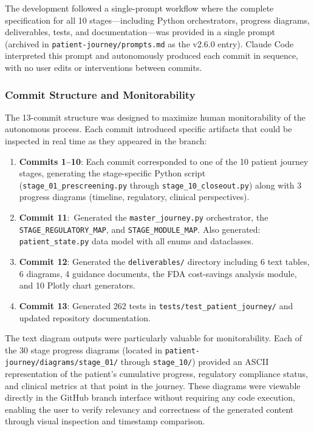 \documentclass{article}
\begin{document}
The development followed a single-prompt workflow where the complete specification for all 10 stages---including Python orchestrators, progress diagrams, deliverables, tests, and documentation---was provided in a single prompt (archived in \texttt{patient-journey/prompts.md} as the v2.6.0 entry). Claude Code interpreted this prompt and autonomously produced each commit in sequence, with no user edits or interventions between commits.

\subsubsection{Commit Structure and Monitorability}

The 13-commit structure was designed to maximize human monitorability of the autonomous process. Each commit introduced specific artifacts that could be inspected in real time as they appeared in the branch:

\begin{enumerate}[leftmargin=*]
\item \textbf{Commits 1--10}: Each commit corresponded to one of the 10 patient journey stages, generating the stage-specific Python script (\texttt{stage\_01\_prescreening.py} through \texttt{stage\_10\_closeout.py}) along with 3 progress diagrams (timeline, regulatory, clinical perspectives).

\item \textbf{Commit 11}:\ Generated the \texttt{master\_journey.py} orchestrator, the \texttt{STAGE\_REGULATORY\_MAP}, and \texttt{STAGE\_MODULE\_MAP}. Also generated: \texttt{patient\_state.py} data model with all enums and dataclasses.

\item \textbf{Commit 12}: Generated the \texttt{deliverables/} directory including 6 text tables, 6 diagrams, 4 guidance documents, the FDA cost-savings analysis module, and 10 Plotly chart generators.

\item \textbf{Commit 13}: Generated 262 tests in \texttt{tests/test\_patient\_journey/} and updated repository documentation.
\end{enumerate}

The text diagram outputs were particularly valuable for monitorability. Each of the 30 stage progress diagrams (located in \texttt{patient-journey/diagrams/stage\_01/} through \texttt{stage\_10/}) provided an ASCII representation of the patient's cumulative progress, regulatory compliance status, and clinical metrics at that point in the journey. These diagrams were viewable directly in the GitHub branch interface without requiring any code execution, enabling the user to verify relevancy and correctness of the generated content through visual inspection and timestamp comparison.
\end{document}
